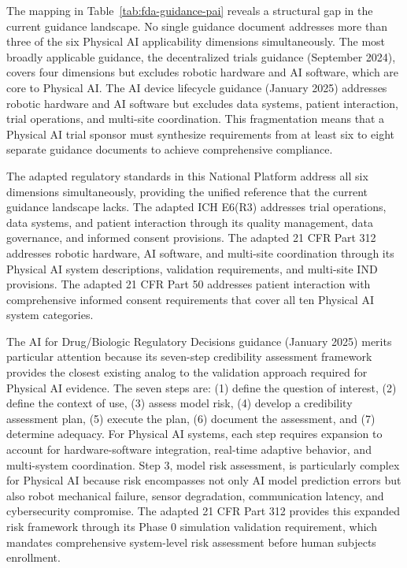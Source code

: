 The mapping in Table~\ref{tab:fda-guidance-pai} reveals a structural gap in
the current guidance landscape. No single guidance document addresses more
than three of the six Physical AI applicability dimensions simultaneously.
The most broadly applicable guidance, the decentralized trials guidance
(September 2024), covers four dimensions but excludes robotic hardware and
AI software, which are core to Physical AI. The AI device lifecycle
guidance (January 2025) addresses robotic hardware and AI software but
excludes data systems, patient interaction, trial operations, and multi-site
coordination. This fragmentation means that a Physical AI trial sponsor must
synthesize requirements from at least six to eight separate guidance
documents to achieve comprehensive compliance.

The adapted regulatory standards in this National Platform
\cite{ich-adapt, cfr50-adapt, cfr312-adapt} address all six dimensions
simultaneously, providing the unified reference that the current guidance
landscape lacks. The adapted ICH E6(R3) \cite{ich-adapt} addresses trial
operations, data systems, and patient interaction through its quality
management, data governance, and informed consent provisions. The adapted
21 CFR Part 312 \cite{cfr312-adapt} addresses robotic hardware, AI software,
and multi-site coordination through its Physical AI system descriptions,
validation requirements, and multi-site IND provisions. The adapted 21 CFR
Part 50 \cite{cfr50-adapt} addresses patient interaction with comprehensive
informed consent requirements that cover all ten Physical AI system
categories.

The AI for Drug/Biologic Regulatory Decisions guidance (January 2025) merits
particular attention because its seven-step credibility assessment framework
provides the closest existing analog to the validation approach required for
Physical AI evidence. The seven steps are: (1) define the question of
interest, (2) define the context of use, (3) assess model risk, (4) develop
a credibility assessment plan, (5) execute the plan, (6) document the
assessment, and (7) determine adequacy. For Physical AI systems, each step
requires expansion to account for hardware-software integration, real-time
adaptive behavior, and multi-system coordination. Step 3, model risk
assessment, is particularly complex for Physical AI because risk encompasses
not only AI model prediction errors but also robot mechanical failure, sensor
degradation, communication latency, and cybersecurity compromise. The
adapted 21 CFR Part 312 \cite{cfr312-adapt} provides this expanded risk
framework through its Phase 0 simulation validation requirement, which
mandates comprehensive system-level risk assessment before human subjects
enrollment.

